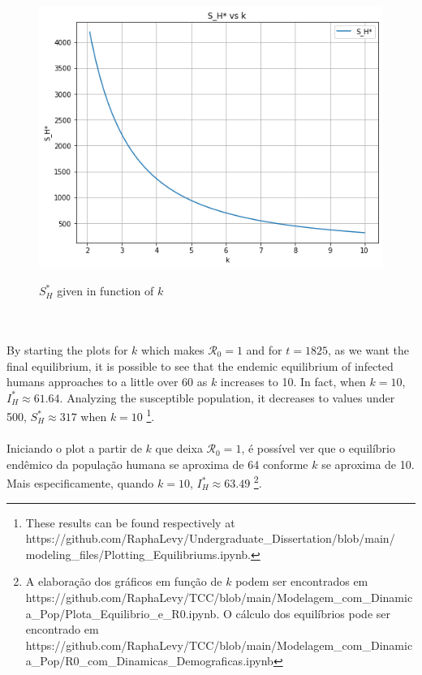 \begin{figure}[!ht]
        \centering
        \hbox{\hspace{5.0em} \includegraphics[scale=0.6] {THESIS-Equilibrium_SH_vs_k.png}}
        \caption{$S_H^*$ given in function of $k$}
\end{figure}
\\\\
By starting the plots for $k$ which makes $\mathcal{R}_0 = 1$ and for $t=1825$, 
as we want the final equilibrium, 
it is possible to see that the endemic equilibrium of infected 
humans approaches to a little over 60 as $k$ increases to 10. 
In fact, when $k=10$, $I_H^* \approx 61.64$. Analyzing the 
susceptible population, it decreases to values under 500, 
$S_H^* \approx 317$ when $k=10$ \footnote{These results can be found respectively at
https://github.com/RaphaLevy/Undergraduate\_Dissertation/blob/main/
\\modeling\_files/Plotting\_Equilibriums.ipynb.}.
\\\\ 
Iniciando o plot a partir de $k$ que deixa $\mathcal{R}_0 = 1$, é possível ver que
o equilíbrio endêmico da população humana se aproxima de 64 conforme $k$ se aproxima de 10.
Mais especificamente, quando $k=10$, $I_H^* \approx 63.49$ \footnote{A elaboração 
dos gráficos em função de $k$ podem ser encontrados em https://github.com/RaphaLevy/TCC/blob/main/Modelagem\_com\_Dinamica\_Pop/Plota\_Equilibrio\_e\_R0.ipynb. 
O cálculo dos equilíbrios pode ser encontrado em
https://github.com/RaphaLevy/TCC/blob/main/Modelagem\_com\_Dinamica\_Pop/R0\_com\_Dinamicas\_Demograficas.ipynb}.
